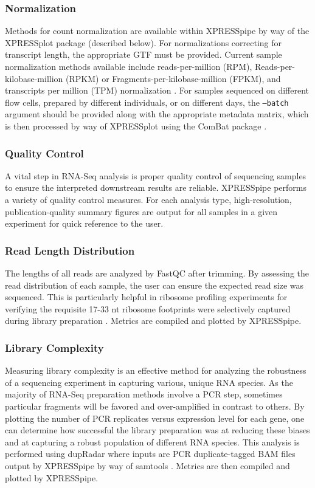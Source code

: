 \documentclass[10pt, oneside]{article}
\begin{document}
\subsubsection{Normalization}
Methods for count normalization are available within XPRESSpipe by way of the XPRESSplot package (described below). For normalizations correcting for transcript length, the appropriate GTF must be provided. Current sample normalization methods available include reads-per-million (RPM), Reads-per-kilobase-million (RPKM) or Fragments-per-kilobase-million (FPKM), and transcripts per million (TPM) normalization \cite{evans_briefbio}. For samples sequenced on different flow cells, prepared by different individuals, or on different days, the \texttt{--batch} argument should be provided along with the appropriate metadata matrix, which is then processed by way of XPRESSplot using the ComBat package \cite{sva}.

\subsubsection{Quality Control}
A vital step in RNA-Seq analysis is proper quality control of sequencing samples to ensure the interpreted downstream results are reliable. XPRESSpipe performs a variety of quality control measures. For each analysis type, high-resolution, publication-quality summary figures are output for all samples in a given experiment for quick reference to the user.

\subsubsection{Read Length Distribution}
The lengths of all reads are analyzed by FastQC \cite{fastqc} after trimming. By assessing the read distribution of each sample, the user can ensure the expected read size was sequenced. This is particularly helpful in ribosome profiling experiments for verifying the requisite 17-33 nt ribosome footprints were selectively captured during library preparation \cite{ingolia_meth, fp_range}. Metrics are compiled and plotted by XPRESSpipe.

\subsubsection{Library Complexity}
Measuring library complexity is an effective method for analyzing the robustness of a sequencing experiment in capturing various, unique RNA species. As the majority of RNA-Seq preparation methods involve a PCR step, sometimes particular fragments will be favored and over-amplified in contrast to others. By plotting the number of PCR replicates versus expression level for each gene, one can determine how successful the library preparation was at reducing these biases and at capturing a robust population of different RNA species. This analysis is performed using dupRadar \cite{dupradar} where inputs are PCR duplicate-tagged BAM files output by XPRESSpipe by way of samtools \cite{samtools}. Metrics are then compiled and plotted by XPRESSpipe.
\end{document}

